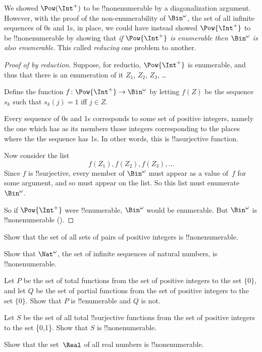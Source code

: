 \documentclass[../../include/open-logic-section]{subfiles}
\begin{document}


We showed $\Pow(\Int^+)$ to be !!{nonenumerable} by a diagonalization
argument. However, with the proof of the non-enumerability of
$\Bin^\omega$, the set of all infinite sequences of 0s and 1s, in
place, we could have instead showed $\Pow{\Int^+}$ to be
!!{nonenumerable} by showing that \emph{if $\Pow{\Int^+}$ is
  enumerable then $\Bin^\omega$ is also enumerable}. This called
\emph{reducing} one problem to another.

\begin{proof}[Proof of {} by reduction]
Suppose, for reductio, $\Pow{\Int^+}$ is enumerable, and thus that
there is an enumeration of it $Z_{1}$, $Z_{2}$, $Z_{3}$, \dots

Define the function $f \colon \Pow{\Int^+} \to \Bin^\omega$ by letting
$f(Z)$ be the sequence $s_{k}$ such that $s_{k}(j) = 1$ iff $j \in Z$.

Every sequence of 0s and 1s corresponds to some set of positive
integers, namely the one which has as its members those integers
corresponding to the places where the the sequence has 1s. In other
words, this is !!a{surjective} function.

Now consider the list 
\[
f(Z_1), f(Z_2), f(Z_3), \dots
\]
Since $f$ is !!{surjective}, every member of $\Bin^\omega$ must
appear as a value of~$f$ for some argument, and so must appear on the
list. So this list must enumerate~$\Bin^\omega$.

So if $\Pow{\Int^+}$ were !!{enumerable}, $\Bin^\omega$ would be enumerable.
But $\Bin^\omega$ is !!{nonenumerable} ().
\end{proof}

\begin{prob}
Show that the set of all sets of pairs of positive integers is
!!{nonenumerable}.
\end{prob}

\begin{prob}
Show that $\Nat^\omega$, the set of infinite sequences of
natural numbers, is !!{nonenumerable}.
\end{prob}

\begin{prob}
Let $P$ be the set of total functions from the set of positive
integers to the set $\{0\}$, and let $Q$ be the set of partial
functions from the set of positive integers to the set $\{0\}$. Show
that $P$ is !!{enumerable} and $Q$ is not.
\end{prob}

\begin{prob}
Let $S$ be the set of all total !!{surjective} functions from the set
of positive integers to the set \{0,1\}. Show that $S$ is
!!{nonenumerable}.
\end{prob}

\begin{prob}
Show that the set~$\Real$ of all real numbers is !!{nonenumerable}.
\end{prob}
\end{document}
